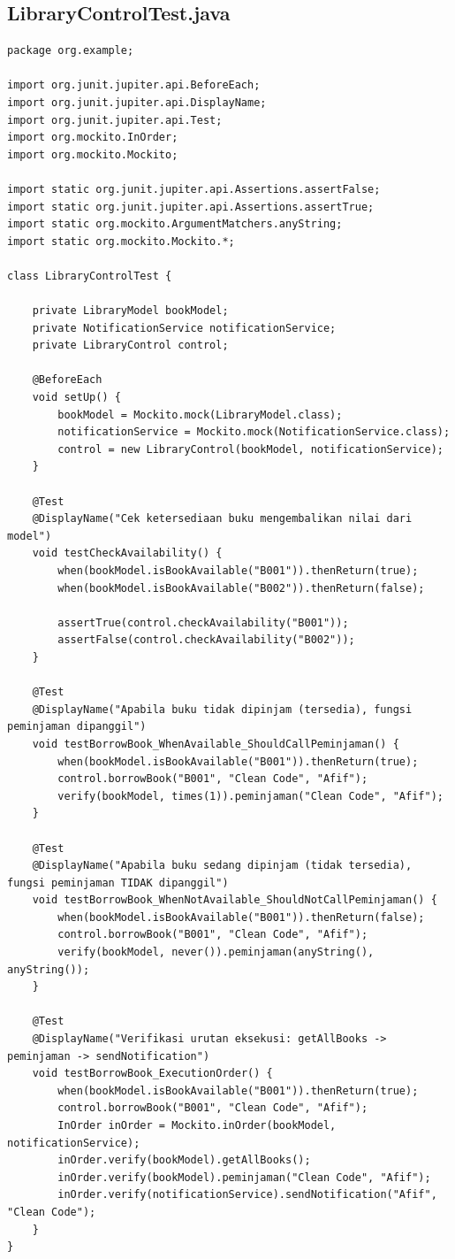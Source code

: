 \documentclass[a4paper,12pt]{article}
\begin{document}
\subsection{LibraryControlTest.java}
\begin{lstlisting}[style=javastyle, caption={LibraryControlTest.java}]
package org.example;

import org.junit.jupiter.api.BeforeEach;
import org.junit.jupiter.api.DisplayName;
import org.junit.jupiter.api.Test;
import org.mockito.InOrder;
import org.mockito.Mockito;

import static org.junit.jupiter.api.Assertions.assertFalse;
import static org.junit.jupiter.api.Assertions.assertTrue;
import static org.mockito.ArgumentMatchers.anyString;
import static org.mockito.Mockito.*;

class LibraryControlTest {

    private LibraryModel bookModel;
    private NotificationService notificationService;
    private LibraryControl control;

    @BeforeEach
    void setUp() {
        bookModel = Mockito.mock(LibraryModel.class);
        notificationService = Mockito.mock(NotificationService.class);
        control = new LibraryControl(bookModel, notificationService);
    }

    @Test
    @DisplayName("Cek ketersediaan buku mengembalikan nilai dari model")
    void testCheckAvailability() {
        when(bookModel.isBookAvailable("B001")).thenReturn(true);
        when(bookModel.isBookAvailable("B002")).thenReturn(false);

        assertTrue(control.checkAvailability("B001"));
        assertFalse(control.checkAvailability("B002"));
    }

    @Test
    @DisplayName("Apabila buku tidak dipinjam (tersedia), fungsi peminjaman dipanggil")
    void testBorrowBook_WhenAvailable_ShouldCallPeminjaman() {
        when(bookModel.isBookAvailable("B001")).thenReturn(true);
        control.borrowBook("B001", "Clean Code", "Afif");
        verify(bookModel, times(1)).peminjaman("Clean Code", "Afif");
    }

    @Test
    @DisplayName("Apabila buku sedang dipinjam (tidak tersedia), fungsi peminjaman TIDAK dipanggil")
    void testBorrowBook_WhenNotAvailable_ShouldNotCallPeminjaman() {
        when(bookModel.isBookAvailable("B001")).thenReturn(false);
        control.borrowBook("B001", "Clean Code", "Afif");
        verify(bookModel, never()).peminjaman(anyString(), anyString());
    }

    @Test
    @DisplayName("Verifikasi urutan eksekusi: getAllBooks -> peminjaman -> sendNotification")
    void testBorrowBook_ExecutionOrder() {
        when(bookModel.isBookAvailable("B001")).thenReturn(true);
        control.borrowBook("B001", "Clean Code", "Afif");
        InOrder inOrder = Mockito.inOrder(bookModel, notificationService);
        inOrder.verify(bookModel).getAllBooks();
        inOrder.verify(bookModel).peminjaman("Clean Code", "Afif");
        inOrder.verify(notificationService).sendNotification("Afif", "Clean Code");
    }
}
\end{lstlisting}
\end{document}
